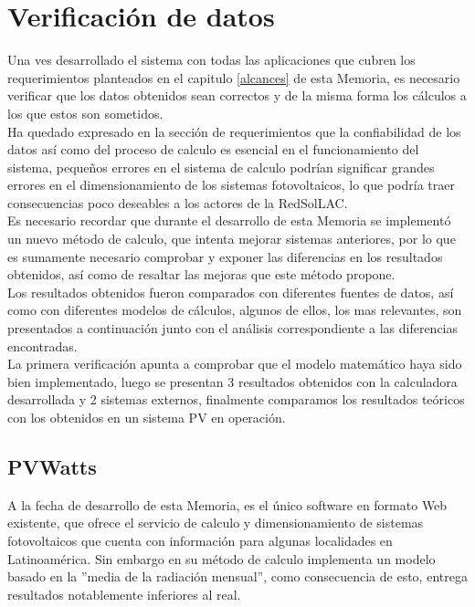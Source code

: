 \newpage
\section{Verificación de datos}
Una ves desarrollado el sistema con todas las aplicaciones que cubren los requerimientos planteados en el capitulo \ref{alcances} de esta Memoria, es necesario verificar que los datos obtenidos sean correctos y de la misma forma los cálculos a los que estos son sometidos.\\
Ha quedado expresado en la sección de requerimientos que la confiabilidad de los datos así como del proceso de calculo es esencial en el funcionamiento del sistema, pequeños errores en el sistema de calculo podrían significar grandes errores en el dimensionamiento de los sistemas fotovoltaicos, lo que podría traer consecuencias poco deseables a los actores de la RedSolLAC.\\
Es necesario recordar que durante el desarrollo de esta Memoria se implementó un nuevo método de calculo, que intenta mejorar sistemas anteriores, por lo que es sumamente necesario comprobar y exponer las diferencias en los resultados obtenidos, así como de resaltar las mejoras que este método propone.\\

Los resultados obtenidos fueron comparados con diferentes fuentes de datos, así como con diferentes modelos de cálculos, algunos de ellos, los mas relevantes, son presentados a continuación junto con el análisis correspondiente a las diferencias encontradas.\\
La primera verificación apunta a comprobar que el modelo matemático haya sido bien implementado, luego se presentan 3 resultados obtenidos con la calculadora desarrollada y 2 sistemas externos, finalmente comparamos los resultados teóricos con los obtenidos en un sistema PV en operación.\\

\subsection{PVWatts}
A la fecha de desarrollo de esta Memoria, es el único software en formato Web existente, que ofrece el servicio de calculo y dimensionamiento de sistemas fotovoltaicos que cuenta con información para algunas localidades en Latinoamérica. Sin embargo en su método de calculo implementa un modelo basado en la ''media de la radiación mensual'', como consecuencia de esto, entrega resultados notablemente inferiores al real.\\ 
